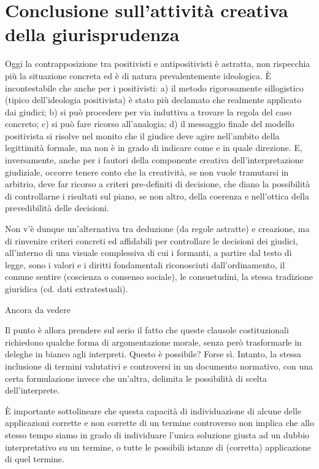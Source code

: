 \section{Conclusione sull'attività creativa della giurisprudenza}

Oggi la contrapposizione tra positivisti e antipositivisti è astratta, non rispecchia più la situazione concreta ed è di natura prevalentemente ideologica. È incontestabile che anche per i positivisti:
a) il metodo rigorosamente sillogistico (tipico dell'ideologia positivista) è stato più declamato che realmente applicato dai giudici; 
b) si può procedere per via induttiva a trovare la regola del caso concreto; 
c) si può fare ricorso all'analogia; 
d) il messaggio finale del modello positivista si risolve nel monito che il giudice deve agire nell'ambito della legittimità formale, ma non è in grado di indicare come e in quale direzione.
E, inversamente, anche per i fautori della componente creativa dell'interpretazione giudiziale, occorre tenere conto che la creatività, se non vuole tramutarsi in arbitrio, deve far ricorso a criteri pre-definiti di decisione, che diano la possibilità di controllarne i risultati sul piano, se non altro, della coerenza e nell'ottica della prevedibilità delle decisioni. 

Non v'è dunque un'alternativa tra deduzione (da regole astratte) e creazione, ma di rinvenire criteri concreti ed affidabili per controllare le decisioni dei giudici, all'interno di una visuale complessiva di cui i formanti, a partire dal testo di legge, sono i valori e i diritti fondamentali riconosciuti
dall'ordinamento, il comune sentire (coscienza o consenso sociale), le consuetudini, la stessa tradizione giuridica (cd. dati extratestuali).


Ancora da vedere


Il punto è allora prendere sul serio il fatto che queste clausole costituzionali richiedono qualche forma di argomentazione morale, senza però trasformarle in deleghe in bianco agli interpreti. Questo è possibile?
Forse sì. Intanto, la stessa inclusione di termini valutativi e controversi in un documento normativo, con una certa formulazione invece che un’altra, delimita le possibilità di scelta dell’interprete.

È importante sottolineare che questa capacità di individuazione di alcune delle applicazioni corrette e non
corrette di un termine controverso non implica che allo stesso tempo siamo in grado di individuare l’unica soluzione giusta ad un dubbio interpretativo su un termine, o tutte le possibili istanze di (corretta) applicazione di quel termine.

